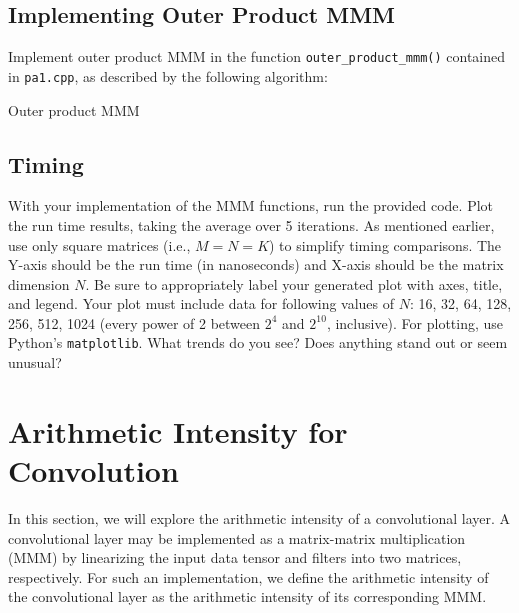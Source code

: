 \documentclass[a4 paper]{article}
\begin{document}
\subsection*{Implementing Outer Product MMM}
Implement outer product MMM in the function \texttt{outer\_product\_mmm()} contained in \texttt{pa1.cpp}, as described by the following algorithm:

\begin{algorithm}[H]
\SetAlgoLined
\SetInd{0.25em}{0.5em}
\caption{Outer product MMM}
\label{algo:naivemm-kmn}
\end{algorithm}

\subsection*{Timing}
With your implementation of the MMM functions, run the provided code.
Plot the run time results, taking the average over 5 iterations.
As mentioned earlier, use only square matrices (i.e., $M = N = K$) to simplify timing comparisons.
The Y-axis should be the run time (in nanoseconds) and X-axis should be the matrix dimension $N$.
Be sure to appropriately label your generated plot with axes, title, and legend.
Your plot must include data for following values of $N$: 16, 32, 64, 128, 256, 512, 1024 (every power of 2 between $2^4$ and $2^{10}$, inclusive).
For plotting, use Python’s \texttt{matplotlib}.
What trends do you see?
Does anything stand out or seem unusual?

\solution{}

\section{Arithmetic Intensity for Convolution}
\label{sec:cnn_ai}
In this section, we will explore the arithmetic intensity of a convolutional layer.
A convolutional layer may be implemented as a matrix-matrix multiplication (MMM) by linearizing the input data tensor and filters into two matrices, respectively. 
For such an implementation, we define the arithmetic intensity of the convolutional layer as the arithmetic intensity of its corresponding MMM.
\end{document}
